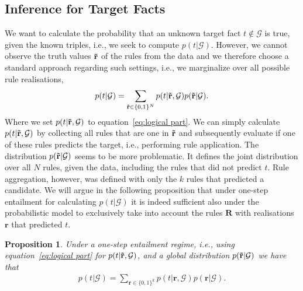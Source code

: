 \documentclass{article}
\theoremstyle{plain}
\newtheorem{proposition}[theorem]{Proposition}
\theoremstyle{remark}
\newcommand{\vecallrules}{\mathbf{\Tilde{r}}}
\newcommand{\vecallfiredrules}{\mathbf{r}}
\newcommand{\randomvecfiredrules}{\mathbf{R}}
\newcommand{\triple}{t}
\newcommand{\alltriples}{\mathcal{G}}
\begin{document}
\subsection{Inference for Target Facts} \label{sec: inference over the knowledge graph}
We want to calculate the probability that an unknown target fact $t \notin \alltriples$ is true, given the known triples, i.e., we seek to compute  $ p(t | \alltriples)$. However, we cannot observe the truth values $\vecallrules$ of the rules from the data and we therefore choose a standard approach regarding such settings, i.e., we marginalize over all possible rule realisations, 
\begin{align}
    p(t | \alltriples) = \sum_{\vecallrules \in \{0, 1\}^N}  p(t |\vecallrules, \alltriples) p(\vecallrules | \alltriples). \label{eq: probab model final}
\end{align}
Where we set $p(t |\vecallrules, \alltriples)$ to equation~\eqref{eq:logical part}. We can simply calculate $p(t |\vecallrules, \alltriples)$ by collecting all rules that are one in $\vecallrules$ and subsequently evaluate if one of these rules predicts the target, i.e., performing rule application. The distribution $p(\vecallrules | \alltriples)$ seems to be more problematic. It defines the joint distribution over all $N$ rules, given the data, including the rules that did not predict $\triple$. Rule aggregation, however, was defined with only the $k$ rules that predicted a candidate. We will argue in the following proposition that under one-step entailment for calculating $p(t | \alltriples)$ it is indeed sufficient also under the probabilistic model to exclusively take into account the rules $\randomvecfiredrules$ with realisations $\vecallfiredrules$ that predicted $\triple$.

\begin{proposition} \label{prop: kvsN}
    Under a one-step entailment regime, i.e., using equation~\eqref{eq:logical part} for $p(t |\vecallrules, \alltriples)$, and a global distribution $p(\vecallrules | \alltriples)$ we have that
    \begin{align}
     p(t | \alltriples) = \sum_{\vecallfiredrules\in \{0, 1\}^k}  p(t |\vecallfiredrules, \alltriples) p(\vecallfiredrules | \alltriples). \label{eq: modelWithKrules}  
    \end{align}
\end{proposition}
\end{document}
